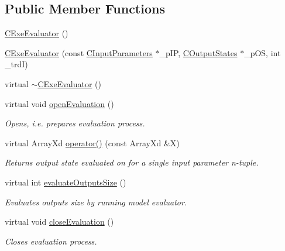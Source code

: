 \subsection*{Public Member Functions}
\begin{DoxyCompactItemize}
\item 
\hyperlink{class_go_s_u_m_1_1_c_exe_evaluator_a35eb03f3e1189c969a81c57b6fe73b92}{C\-Exe\-Evaluator} ()
\item 
\hyperlink{class_go_s_u_m_1_1_c_exe_evaluator_af3721a6b87e61dcdb5e79092c1455fa7}{C\-Exe\-Evaluator} (const \hyperlink{class_go_s_u_m_1_1_c_input_parameters}{C\-Input\-Parameters} $\ast$\-\_\-p\-I\-P, \hyperlink{class_go_s_u_m_1_1_c_output_states}{C\-Output\-States} $\ast$\-\_\-p\-O\-S, int \-\_\-trd\-I)
\item 
virtual \hyperlink{class_go_s_u_m_1_1_c_exe_evaluator_ad6c59f01d0d1759eadb90d7f577ed8e0}{$\sim$\-C\-Exe\-Evaluator} ()
\item 
virtual void \hyperlink{class_go_s_u_m_1_1_c_exe_evaluator_abdc5b11c31ed73a34499e135eab45ef8}{open\-Evaluation} ()
\begin{DoxyCompactList}\small\item\em Opens, i.\-e. prepares evaluation process. \end{DoxyCompactList}\item 
virtual Array\-Xd \hyperlink{class_go_s_u_m_1_1_c_exe_evaluator_ae388d8a8bef01f0a3fc3e6cecb341576}{operator()} (const Array\-Xd \&X)
\begin{DoxyCompactList}\small\item\em Returns output state evaluated on for a single input parameter n-\/tuple. \end{DoxyCompactList}\item 
virtual int \hyperlink{class_go_s_u_m_1_1_c_exe_evaluator_a3a8ea5f4af5c653421f27ace8fb57181}{evaluate\-Outputs\-Size} ()
\begin{DoxyCompactList}\small\item\em Evaluates outputs size by running model evaluator. \end{DoxyCompactList}\item 
virtual void \hyperlink{class_go_s_u_m_1_1_c_exe_evaluator_a0e18062b8ec197437febdfa46dd7b45b}{close\-Evaluation} ()
\begin{DoxyCompactList}\small\item\em Closes evaluation process. \end{DoxyCompactList}\end{DoxyCompactItemize}

